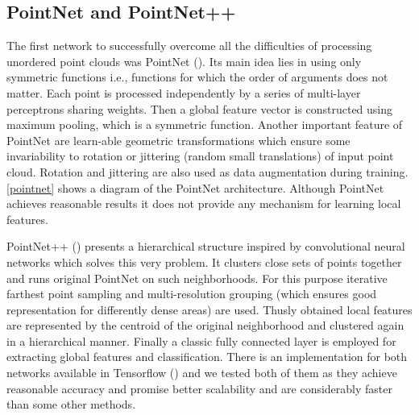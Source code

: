 \subsection{PointNet and PointNet++}
The first network to successfully overcome all the difficulties of processing unordered point clouds was PointNet (\cite{qi_pointnet:_2016}). Its main idea lies in using only symmetric functions i.e., functions for which the order of arguments does not matter. Each point is processed independently by a series of multi-layer perceptrons sharing weights. Then a global feature vector is constructed using maximum pooling, which is a symmetric function. Another important feature of PointNet are learn-able geometric transformations which ensure some invariability to rotation or jittering (random small translations) of input point cloud. Rotation and jittering are also used as data augmentation during training. \autoref{pointnet} shows a diagram of the PointNet architecture.
Although PointNet achieves reasonable results it does not provide any mechanism for learning local features.\par 
PointNet++ (\cite{qi_pointnet++:_2017}) presents a hierarchical structure inspired by convolutional neural networks which solves this very problem. It clusters close sets of points together and runs original PointNet on such neighborhoods. For this purpose iterative farthest point sampling and multi-resolution grouping (which ensures good representation for differently dense areas) are used. Thusly obtained local features are represented by the centroid of the original neighborhood and clustered again in a hierarchical manner. Finally a classic fully connected layer is employed for extracting global features and classification.
There is an implementation for both networks available in Tensorflow (\cite{qi_pointnet_2016, qi_pointnet++_2017}) and we tested both of them as they achieve reasonable accuracy and promise better scalability and are considerably faster than some other methods.



